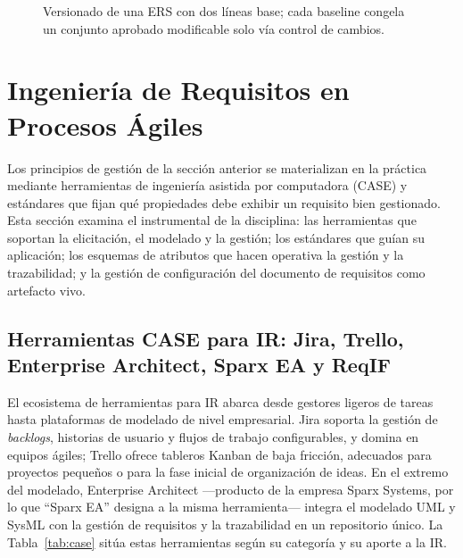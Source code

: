 \documentclass[11pt,a4paper,oneside]{report}
\begin{document}
	\begin{figure}[htbp]
		\centering
		\caption{Versionado de una ERS con dos l\'ineas base; cada baseline congela un conjunto aprobado modificable solo v\'ia control de cambios.}
		\label{fig:baseline}
	\end{figure}
	
	\section{Ingenier\'ia de Requisitos en Procesos \'Agiles}
	
	Los principios de gesti\'on de la secci\'on anterior se materializan en la pr\'actica mediante herramientas de ingenier\'ia asistida por computadora (CASE) y est\'andares que fijan qu\'e propiedades debe exhibir un requisito bien gestionado. Esta secci\'on examina el instrumental de la disciplina: las herramientas que soportan la elicitaci\'on, el modelado y la gesti\'on; los est\'andares que gu\'ian su aplicaci\'on; los esquemas de atributos que hacen operativa la gesti\'on y la trazabilidad; y la gesti\'on de configuraci\'on del documento de requisitos como artefacto vivo.
	
	\subsection{Herramientas CASE para IR: Jira, Trello, Enterprise Architect, Sparx EA y ReqIF}
	
	El ecosistema de herramientas para IR abarca desde gestores ligeros de tareas hasta plataformas de modelado de nivel empresarial. Jira soporta la gesti\'on de \textit{backlogs}, historias de usuario y flujos de trabajo configurables, y domina en equipos \'agiles; Trello ofrece tableros Kanban de baja fricci\'on, adecuados para proyectos peque\~nos o para la fase inicial de organizaci\'on de ideas. En el extremo del modelado, Enterprise Architect ---producto de la empresa Sparx Systems, por lo que ``Sparx EA'' designa a la misma herramienta--- integra el modelado UML y SysML con la gesti\'on de requisitos y la trazabilidad en un repositorio \'unico. La Tabla~\ref{tab:case} sit\'ua estas herramientas seg\'un su categor\'ia y su aporte a la IR.
	
\end{document}
